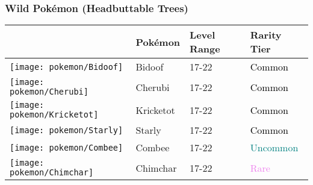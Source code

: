 \subsubsection{Wild Pokémon (Headbuttable Trees)}%
\label{ssubsec:WildPokmon(HeadbuttableTrees)}%
\begin{longtable}{||l l l l||}%
\hline%
&Pokémon&Level Range&Rarity Tier\\%
\hline%
\endhead%
\hline%
\texttt{[image: pokemon/Bidoof]}&Bidoof&17{-}22&\textcolor{black}{%
Common%
}\\%
\hline%
\texttt{[image: pokemon/Cherubi]}&Cherubi&17{-}22&\textcolor{black}{%
Common%
}\\%
\hline%
\texttt{[image: pokemon/Kricketot]}&Kricketot&17{-}22&\textcolor{black}{%
Common%
}\\%
\hline%
\texttt{[image: pokemon/Starly]}&Starly&17{-}22&\textcolor{black}{%
Common%
}\\%
\hline%
\texttt{[image: pokemon/Combee]}&Combee&17{-}22&\textcolor{teal}{%
Uncommon%
}\\%
\hline%
\texttt{[image: pokemon/Chimchar]}&Chimchar&17{-}22&\textcolor{violet}{%
Rare%
}\\%
\hline%
\end{longtable}%
\caption{Wild Pokemon in Route 208 (Headbuttable Trees)}
